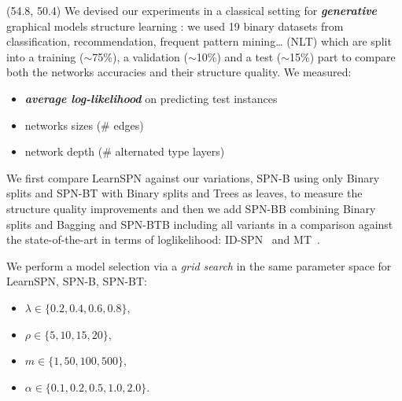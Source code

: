 \documentclass[final]{beamer}
\begin{document}
\begin{frame}{}
  \begin{textblock}{25.2}(54.8, 50.4)
    \footnotesize
    \setlength{\leftmargini}{30pt}
    We devised our experiments in a classical setting for \emph{\textbf{generative}} graphical models
    structure learning \parencite{Gens2013}: we used 19 binary datasets from classification, recommendation,
      frequent pattern mining\dots \parencite{Haaren2012} (NLT) which
      are split into a training ($\sim$75\%), a  validation
      ($\sim$10\%) and a test ($\sim$15\%) part to compare both the
      networks accuracies and their structure quality. We measured:
    \begin{itemize}
    \item \emph{\textbf{average log-likelihood}} on predicting test
      instances
    \item networks sizes (\# edges)
    \item network depth (\# alternated type layers)

    \end{itemize}\bigskip
    
    We first compare \textsf{LearnSPN} against our variations,
    \textsf{SPN-B} using only \textsf{B}inary splits and  \textsf{SPN-BT} with \textsf{B}inary splits and \textsf{T}rees as leaves, to
    measure the structure quality improvements and then we add
    \textsf{SPN-BB} combining \textsf{B}inary splits and
    \textsf{B}agging and \textsf{SPN-BTB} including all variants in a comparison
    against the state-of-the-art in terms of loglikelihood: 
    \textsf{ID-SPN}~\parencite{Rooshenas2014-short} and \textsf{MT}~\parencite{Meila2000}.
    
   
    We perform a model selection via a \textit{grid search} in the same parameter
    space for \textsf{LearnSPN}, \textsf{SPN-B}, \textsf{SPN-BT}:\\[-10pt]
    \begin{minipage}[t]{0.35\linewidth}
      \begin{itemize}
      \item \scriptsize$\lambda \in \{0.2, 0.4, 0.6, 0.8\}$,
      \item \scriptsize$\rho \in \{5, 10, 15, 20\}$, 
      \end{itemize}
    \end{minipage}\begin{minipage}[t]{0.5\linewidth}
      \begin{itemize}
      \item \scriptsize$m \in \{1, 50, 100, 500\}$, 
      \item \scriptsize$\alpha \in \{ 0.1, 0.2, 0.5, 1.0, 2.0\}$.
      \end{itemize}
    \end{minipage}\\[17pt]
    

\end{textblock}
\end{frame}
\end{document}

